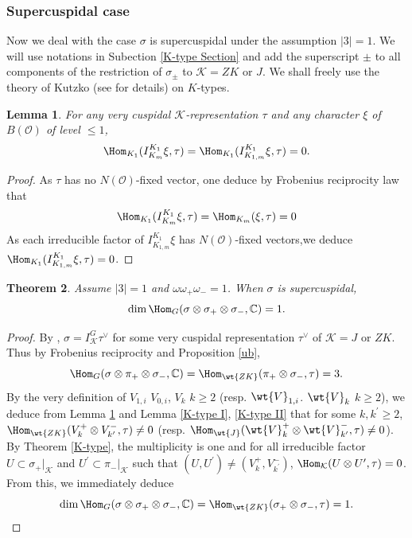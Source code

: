 \documentclass[11pt,reqno]{amsart}
\newcommand{\BC}{{\mathbb {C}}} \newcommand{\BD}{{\mathbb {D}}}
\newcommand{\CK}{{\mathcal {K}}} \newcommand{\CL}{{\mathcal {L}}}
\newcommand{\CO}{{\mathcal {O}}} \newcommand{\CP}{{\mathcal {P}}}
\theoremstyle{plain}
\newtheorem{thm}{Theorem}[section] \newtheorem{cor}[thm]{Corollary}
\newtheorem{lem}[thm]{Lemma}  \newtheorem{prop}[thm]{Proposition}
\theoremstyle{remark} \newtheorem{remark}[thm]{Remark}
\theoremstyle{definition} \newtheorem{exercise}[thm]{Exercise}
\theoremstyle{definition} \newtheorem{example}[thm]{Example} \newtheorem{condition}[thm]{Condition}
\numberwithin{equation}{section}
\renewcommand{\-}{\text{--}}
\begin{document}
\subsubsection{Supercuspidal case}\label{supercuspidal case}
Now we  deal with the case $\sigma$ is supercuspidal under the assumption $|3|=1$. We will use notations in  Subection \ref{K-type Section} and  add the superscript $\pm$ to all components of the restriction of $\sigma_\pm$ to $\CK=ZK$ or $J$. We shall freely use the theory of Kutzko (see \cite[Section 6]{Pra90} for details) on $K$-types. 
\begin{lem}\label{very cuspidal}For any very cuspidal $\CK$-representation $\tau$ and any character $\xi$ of $B(\CO)$ of level $\leq1$, 
\[\Hom_{K_1}(I_{K_m}^{K_1}\xi,\tau)=\Hom_{K_1}(I_{K_{1,m}}^{K_1}\xi,\tau)=0.\]
\end{lem}
\begin{proof}As $\tau$ has no $N(\CO)$-fixed vector, one deduce by Frobenius reciprocity law that
\[\Hom_{K_1}(I_{K_m}^{K_1}\xi,\tau)=\Hom_{K_m}(\xi,\tau)=0\]
As each irreducible factor of $I_{K_{1,m}}^{K_1}\xi$ has $N(\CO)$-fixed vectors,we deduce  $\Hom_{K_1}(I_{K_{1,m}}^{K_1}\xi,\tau)=0$.
\end{proof}
\begin{thm}\label{sc}Assume $|3|=1$ and $\omega\omega_+\omega_{-}=1$. When $\sigma$ is supercuspidal, 
\[\dim\Hom_G(\sigma\otimes\sigma_+\otimes\sigma_-,\BC)=1.\]
\end{thm}
\begin{proof}By \cite[Theorem 6,1]{Pra90}, $\sigma=I_{\CK}^G\tau^\vee$ for some very cuspidal representation $\tau^\vee$ of $\CK=J$ or $ZK$. Thus by Frobenius reciprocity and Proposition \ref{ub},
\[\Hom_G(\sigma\otimes\pi_+\otimes\sigma_-,\BC)=\Hom_{\wt{ZK}}(\pi_+\otimes\sigma_-,\tau)=3.\]
By the very definition of $V_{1,i}$ $V_{0,i}$, $V_{k}$ $k\geq 2$ (resp. $\wt{V}_{1,i}$. $\wt{V}_k$ $k\geq2$), we deduce from Lemma \ref{very cuspidal} and Lemma \ref{K-type I}, \ref{K-type II} that for some $k,k^\prime\geq2$, 
$\Hom_{\wt{ZK}}(V_k^+\otimes V_{k^\prime}^{-},\tau)\neq0$ (resp. $\Hom_{\wt{J}}(\wt{V}_k^+\otimes \wt{V}_{k^\prime}^{-},\tau)\neq0$). By Theorem \ref{K-type},  the multiplicity is one and   for all irreducible factor $U\subset \sigma_+|_{\CK}$ and $U^\prime\subset \pi_-|_{\CK}$ such that $(U,U^\prime)\neq (V_k^+,V_{k^\prime}^-)$, $\Hom_{\CK}(U\otimes U^\prime,\tau)=0$. From this, we immediately deduce
\[\dim \Hom_G(\sigma\otimes\sigma_+\otimes\sigma_-,\BC)=\Hom_{\wt{ZK}}(\sigma_+\otimes\sigma_-,\tau)=1.\]
\end{proof}
\end{document}
